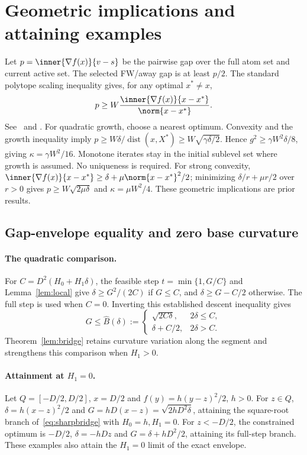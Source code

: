 \section{Geometric implications and attaining examples}
\label{app:geometry}
Let $p=\inner{\nabla f(x)}{v-s}$ be the pairwise gap over the full
atom set and current active set. The selected FW/away gap is at
least $p/2$. The standard polytope scaling inequality gives, for
any optimal $x^*\ne x$,
\[
 p\ge W\frac{\inner{\nabla f(x)}{x-x^*}}{\norm{x-x^*}}.
\]
See~\cite[Theorem 3]{lacostejaggi} and
\cite[Lemmas 3.4 and 3.6]{restartfw}. For quadratic growth, choose
a nearest optimum. Convexity and the growth inequality imply
$p\ge W\delta/\operatorname{dist}(x,X^*)
\ge W\sqrt{\gamma\delta/2}$. Hence
$g^2\ge\gamma W^2\delta/8$, giving $\kappa=\gamma W^2/16$.
Monotone iterates stay in the initial sublevel set where growth is
assumed. No uniqueness is required. For strong convexity,
$\inner{\nabla f(x)}{x-x^*}\ge\delta+\mu\norm{x-x^*}^2/2$;
minimizing $\delta/r+\mu r/2$ over $r>0$ gives
$p\ge W\sqrt{2\mu\delta}$ and $\kappa=\mu W^2/4$.
These geometric implications are prior results.

\subsection{Gap-envelope equality and zero base curvature}
\label{app:bridge}
\paragraph{The quadratic comparison.}
For $C=D^2(H_0+H_1\delta)$, the feasible step
$t=\min\{1,G/C\}$ and Lemma~\ref{lem:local} give
$\delta\ge G^2/(2C)$ if $G\le C$, and
$\delta\ge G-C/2$ otherwise. The full step is used when $C=0$.
Inverting this established descent inequality gives
\begin{equation}\label{eq:sharpbridge}
 G\le\widehat B(\delta):=
 \begin{cases}\sqrt{2C\delta},&2\delta\le C,\\
 \delta+C/2,&2\delta>C.\end{cases}
\end{equation}
Theorem~\ref{lem:bridge} retains curvature variation along the
segment and strengthens this comparison when $H_1>0$.

\paragraph{Attainment at $H_1=0$.}
Let $Q=[-D/2,D/2]$, $x=D/2$ and $f(y)=h(y-z)^2/2$, $h>0$.
For $z\in Q$, $\delta=h(x-z)^2/2$ and
$G=hD(x-z)=\sqrt{2hD^2\delta}$, attaining the square-root branch
of~\eqref{eq:sharpbridge} with $H_0=h,H_1=0$.
For $z<-D/2$, the constrained optimum is $-D/2$,
$\delta=-hDz$ and $G=\delta+hD^2/2$, attaining its full-step branch.
These examples also attain the $H_1=0$ limit of the exact envelope.


